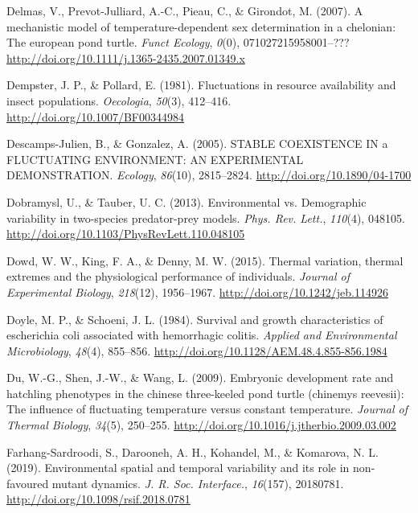 \documentclass[12pt,twoside]{reedthesis}
\begin{document}
\leavevmode\hypertarget{ref-delmas_mechanistic_2007}{}%
Delmas, V., Prevot-Julliard, A.-C., Pieau, C., \& Girondot, M. (2007). A mechanistic model of temperature-dependent sex determination in a chelonian: The european pond turtle. \emph{Funct Ecology}, \emph{0}(0), 071027215958001--??? \url{http://doi.org/10.1111/j.1365-2435.2007.01349.x}

\leavevmode\hypertarget{ref-dempster_fluctuations_1981}{}%
Dempster, J. P., \& Pollard, E. (1981). Fluctuations in resource availability and insect populations. \emph{Oecologia}, \emph{50}(3), 412--416. \url{http://doi.org/10.1007/BF00344984}

\leavevmode\hypertarget{ref-descamps-julien_stable_2005}{}%
Descamps-Julien, B., \& Gonzalez, A. (2005). STABLE COEXISTENCE IN a FLUCTUATING ENVIRONMENT: AN EXPERIMENTAL DEMONSTRATION. \emph{Ecology}, \emph{86}(10), 2815--2824. \url{http://doi.org/10.1890/04-1700}

\leavevmode\hypertarget{ref-dobramysl_environmental_2013}{}%
Dobramysl, U., \& Tauber, U. C. (2013). Environmental vs. Demographic variability in two-species predator-prey models. \emph{Phys. Rev. Lett.}, \emph{110}(4), 048105. \url{http://doi.org/10.1103/PhysRevLett.110.048105}

\leavevmode\hypertarget{ref-dowd_thermal_2015}{}%
Dowd, W. W., King, F. A., \& Denny, M. W. (2015). Thermal variation, thermal extremes and the physiological performance of individuals. \emph{Journal of Experimental Biology}, \emph{218}(12), 1956--1967. \url{http://doi.org/10.1242/jeb.114926}

\leavevmode\hypertarget{ref-doyle_survival_1984}{}%
Doyle, M. P., \& Schoeni, J. L. (1984). Survival and growth characteristics of escherichia coli associated with hemorrhagic colitis. \emph{Applied and Environmental Microbiology}, \emph{48}(4), 855--856. \url{http://doi.org/10.1128/AEM.48.4.855-856.1984}

\leavevmode\hypertarget{ref-du_embryonic_2009}{}%
Du, W.-G., Shen, J.-W., \& Wang, L. (2009). Embryonic development rate and hatchling phenotypes in the chinese three-keeled pond turtle (chinemys reevesii): The influence of fluctuating temperature versus constant temperature. \emph{Journal of Thermal Biology}, \emph{34}(5), 250--255. \url{http://doi.org/10.1016/j.jtherbio.2009.03.002}

\leavevmode\hypertarget{ref-farhang-sardroodi_environmental_2019}{}%
Farhang-Sardroodi, S., Darooneh, A. H., Kohandel, M., \& Komarova, N. L. (2019). Environmental spatial and temporal variability and its role in non-favoured mutant dynamics. \emph{J. R. Soc. Interface.}, \emph{16}(157), 20180781. \url{http://doi.org/10.1098/rsif.2018.0781}
\end{document}
